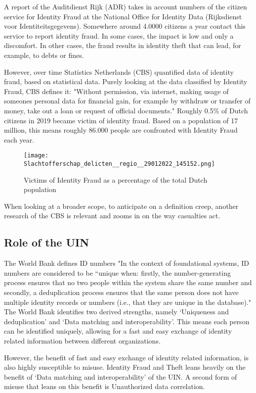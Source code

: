 A report of the Auditdienst Rijk (ADR)\cite{ADR} takes in account numbers of the citizen service for Identity Fraud at the National Office for Identity Data (Rijksdienst voor Identiteitsgegevens). Somewhere around 4.0000 citizens a year contact this service to report identity fraud. In some cases, the impact is low and only a discomfort. In other cases, the fraud results in identity theft that can lead, for example, to debts or fines.\par

However, over time Statistics Netherlands (CBS) quantified data of identity fraud, based on statistical data. Purely looking at the data classified by Identity Fraud, CBS defines it: "Without permission, via internet, making usage of someones personal data for financial gain, for example by withdraw or transfer of money, take out a loan or request of official documents." Roughly 0.5\% of Dutch citizens in 2019 became victim of identity fraud. Based on a population of 17 million, this means roughly 86.000 people are confronted with Identity Fraud each year.

\graphicspath{ {./images/} }
\begin{figure}
\texttt{[image: Slachtofferschap\_delicten\_\_regio\_\_29012022\_145152.png]}\\
\caption{Victims of Identity Fraud as a percentage of the total Dutch population \cite{CBS_IDFraudTable} \cite{CBS_totalpopulation2019}}
\label{fig:CBS_ID_fraud}
\end{figure}

When looking at a broader scope, to anticipate on a definition creep, another research of the CBS is relevant {\cite{CBS_casualtiesDigitalCrime}} and zooms in on the way casualties act.

\subsection{Role of the UIN}
The World Bank \cite{WorldBank_UIN} defines ID numbers "In the context of foundational systems, ID numbers are considered to be “unique when: firstly, the number-generating process ensures that no two people within the system share the same number and secondly, a deduplication process ensures that the same person does not have multiple identity records or numbers (i.e., that they are unique in the database)." The World Bank identifies two derived strengths, namely ‘Uniqueness and deduplication’ and ‘Data matching and interoperability’. This means each person can be identified uniquely, allowing for a fast and easy exchange of identity related information between different organizations.\par 
However, the benefit of fast and easy exchange of identity related information, is also highly susceptible to misuse. Identity Fraud and Theft leans heavily on the benefit of ‘Data matching and interoperability’ of the UIN. A second form of misuse that leans on this benefit is Unauthorized data correlation. \par

